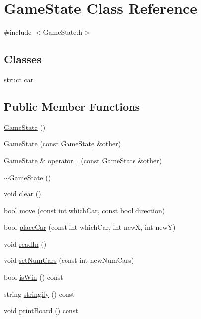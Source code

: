 \hypertarget{class_game_state}{\section{\-Game\-State \-Class \-Reference}
\label{class_game_state}
}


{\ttfamily \#include $<$\-Game\-State.\-h$>$}

\subsection*{\-Classes}
\begin{DoxyCompactItemize}
\item 
struct \hyperlink{struct_game_state_1_1car}{car}
\end{DoxyCompactItemize}
\subsection*{\-Public \-Member \-Functions}
\begin{DoxyCompactItemize}
\item 
\hyperlink{class_game_state_a4fa0a2bf50315c4a35a3890a0adcee5c}{\-Game\-State} ()
\item 
\hyperlink{class_game_state_a532c7e274301a8e46472c70c410e5e4e}{\-Game\-State} (const \hyperlink{class_game_state}{\-Game\-State} \&other)
\item 
\hyperlink{class_game_state}{\-Game\-State} \& \hyperlink{class_game_state_aca9a92a59a95beb5db0ebdcee1c78342}{operator=} (const \hyperlink{class_game_state}{\-Game\-State} \&other)
\item 
\hyperlink{class_game_state_ae623df5042cd0c17daa3394fdcb397b3}{$\sim$\-Game\-State} ()
\item 
void \hyperlink{class_game_state_aa19f7b265ddcdf1c490b1c43556d07e1}{clear} ()
\item 
bool \hyperlink{class_game_state_a7c8aec517b5a00563ff2a029bffca619}{move} (const int which\-Car, const bool direction)
\item 
bool \hyperlink{class_game_state_aa9fe7bdbf5d5c142c9ad99f0a4a21ec1}{place\-Car} (const int which\-Car, int new\-X, int new\-Y)
\item 
void \hyperlink{class_game_state_adc41d9c1697bc98330c7d07d3f05f33d}{read\-In} ()
\item 
void \hyperlink{class_game_state_ab94405b61d638b5c402e9cbdb4cb8584}{set\-Num\-Cars} (const int new\-Num\-Cars)
\item 
bool \hyperlink{class_game_state_a13e26b6d32ebcf1473f91c6a3a13b8a1}{is\-Win} () const 
\item 
string \hyperlink{class_game_state_a21b3d9a3d7fdbdb34cedda150a410ed8}{stringify} () const 
\item 
void \hyperlink{class_game_state_af26e4775b0309c30714c1aca9e652911}{print\-Board} () const 
\end{DoxyCompactItemize}
